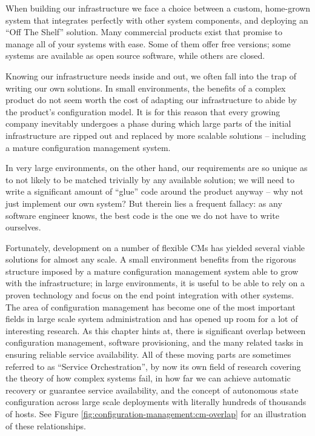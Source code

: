 When building our infrastructure we face a choice
between a custom, home-grown system that integrates
perfectly with other system components, and deploying
an ``Off The Shelf'' solution.  Many commercial
products exist that promise to manage all of your
systems with ease.  Some of them offer free versions;
some systems are available as open source software,
while others are closed.

Knowing our infrastructure needs inside and out, we
often fall into the trap of writing our own solutions.
In small environments, the benefits of a complex
product do not seem worth the cost of adapting our
infrastructure to abide by the product's configuration
model.  It is for this reason that every growing
company inevitably undergoes a phase during which
large parts of the initial infrastructure are ripped
out and replaced by more scalable solutions --
including a mature configuration management system.

In very large environments, on the other hand, our
requirements are so unique as to not likely to be
matched trivially by any available solution; we will
need to write a significant amount of ``glue'' code
around the product anyway -- why not just implement
our own system?  But therein lies a frequent fallacy:
as any software engineer knows, the best code is the
one we do not have to write ourselves.

Fortunately, development on a number of flexible CMs
has yielded several viable solutions for almost any
scale.  A small environment benefits from the rigorous
structure imposed by a mature configuration management
system able to grow with the infrastructure; in large
environments, it is useful to be able to rely on a
proven technology and focus on the end point
integration with other systems.  \\

The area of configuration management has become one of
the most important fields in large scale system
administration and has opened up room for a lot of
interesting research.  As this chapter hints at, there is
significant overlap between configuration management,
software provisioning, and the
many related tasks in ensuring reliable service
availability.  All of these moving parts are sometimes
referred to as ``Service Orchestration'', by now its own field of research
covering the theory of how complex systems fail, in
how far we can achieve automatic recovery or guarantee
service availability, and the concept of autonomous
state configuration across large scale deployments
with literally hundreds of thousands of hosts.  See
Figure \ref{fig:configuration-management:cm-overlap}
for an illustration of these relationships.

